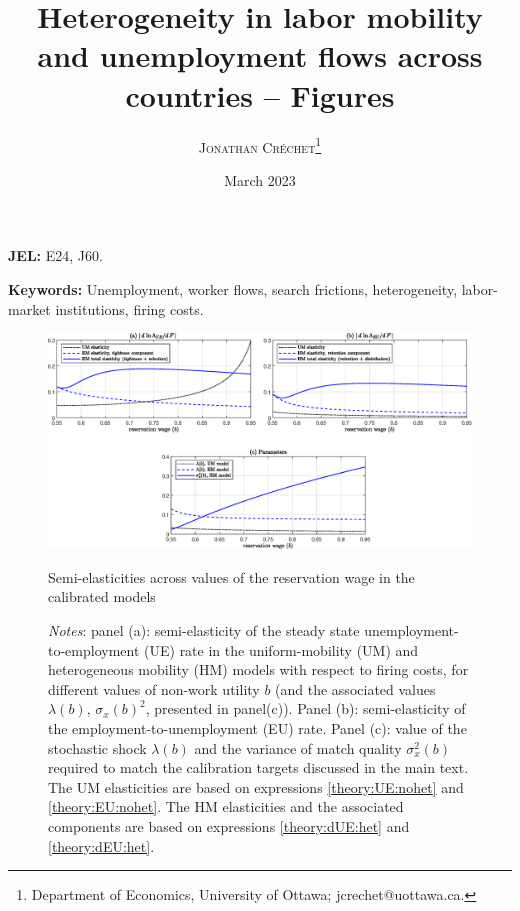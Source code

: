 \documentclass[12pt]{article} %
\author{ \textsc{Jonathan Créchet}\thanks{Department of Economics, University of Ottawa; jcrechet@uottawa.ca.} }
\title{Heterogeneity in labor mobility and unemployment flows across countries -- Figures}
\date{March 2023}
\theoremstyle{plain}
\theoremstyle{definition}
\begin{document}
	
	\maketitle
	
	\noindent \textbf{JEL: } E24, J60.
	
	\noindent \textbf{Keywords: } Unemployment, worker flows, search frictions, heterogeneity, labor-market institutions, firing costs.
	
	\newpage
		
	\begin{figure}[!h]
		\centering
		\includegraphics[width=6in]{Figures/Figure_1.eps}
		\caption{Semi-elasticities across values of the reservation wage in the calibrated models}
		    \caption*{
			\footnotesize \textit{Notes}: panel (a): semi-elasticity of the steady state unemployment-to-employment (UE) rate in the uniform-mobility (UM) and heterogeneous mobility (HM) models with respect to firing costs, for different values of non-work utility $b$ (and the associated values $\lambda(b)$, $\sigma_x(b)^2$, presented in panel(c)). Panel (b): semi-elasticity of the employment-to-unemployment (EU) rate. Panel (c): value of the stochastic shock $\lambda(b)$ and the variance of match quality $\sigma_x^2(b)$ required to match the calibration targets discussed in the main text. The UM elasticities are based on expressions \eqref{theory:UE:nohet} and \eqref{theory:EU:nohet}. The HM elasticities and the associated components are based on expressions \eqref{theory:dUE:het} and \eqref{theory:dEU:het}.}
		\label{fig:fig_1}
	\end{figure}
\end{document}
